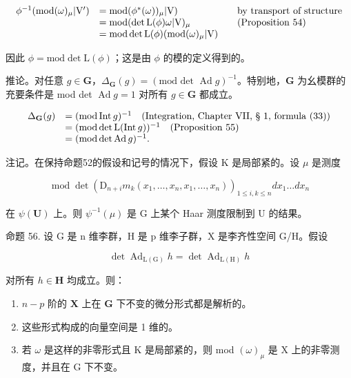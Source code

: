 \[
\begin{array}{r l r l} \phi^ {- 1} (\mathrm{mod} (\omega) _ {\mu}   |   \mathrm{V} ^ {\prime}) & = \mathrm{mod} (\phi^ {*} (\omega)) _ {\mu}   |   \mathrm{V}) & & \text {by transport of structure} \\ & = \mathrm{mod} (\det \mathrm{L} (\phi) \omega   |   \mathrm{V}) _ {\mu} & & \text {(Proposition 54)} \\ & = \mathrm{mod} \det \mathrm{L} (\phi) (\mathrm{mod} (\omega) _ {\mu}   |   \mathrm{V}) \end{array}
\]

因此 \(\phi = \mathrm{mod}\det \mathrm{L}(\phi)\)；这是由 \(\phi\) 的模的定义得到的。

推论。对任意 \(g \in \mathbf{G}\)，\(\Delta_{\mathbf{G}}(g) = (\text{mod det } \operatorname{Ad} g)^{-1}\)。特别地，\(\mathbf{G}\) 为幺模群的充要条件是 mod det \(\operatorname{Ad} g = 1\) 对所有 \(g \in \mathbf{G}\) 都成立。

\[
\begin{array}{r l} \Delta_ {\mathbf {G}} (g) & = (\text {mod} \operatorname{Int} g) ^ {- 1} \quad \text {(Integration, Chapter VII, § 1, formula (33))} \\ & = (\text {mod} \det \operatorname{L} (\operatorname{Int} g)) ^ {- 1} \quad \text {(Proposition 55)} \\ & = (\text {mod} \det \operatorname{Ad} g) ^ {- 1}. \end{array}
\]

注记。在保持命题52的假设和记号的情况下，假设 K 是局部紧的。设 \(\mu\) 是测度

\[
\operatorname{mod} \det (\mathrm{D} _ {n + i} m _ {k} (x _ {1}, \dots , x _ {n}, x _ {1}, \dots , x _ {n})) _ {1 \leqslant i, k \leqslant n} d x _ {1} \dots d x _ {n}
\]

在 \(\psi (\mathbf{U})\) 上。则 \(\psi^{-1}(\mu)\) 是 G 上某个 Haar 测度限制到 U 的结果。

命题 56. 设 G 是 n 维李群，H 是 p 维李子群，X 是李齐性空间 G/H。假设

\[
\det \operatorname{Ad} _ {\mathrm{L} (\mathrm{G})} h = \det \operatorname{Ad} _ {\mathrm{L} (\mathrm{H})} h
\]

对所有 \(h\in \mathbf{H}\) 均成立。则：

\begin{enumerate}
\def\labelenumi{(\roman{enumi})}
\item
  \(n - p\) 阶的 \(\mathbf{X}\) 上在 \(\mathbf{G}\) 下不变的微分形式都是解析的。
\item
  这些形式构成的向量空间是 1 维的。
\item
  若 \(\omega\) 是这样的非零形式且 K 是局部紧的，则 mod \((\omega)_{\mu}\) 是 X 上的非零测度，并且在 G 下不变。
\end{enumerate}

